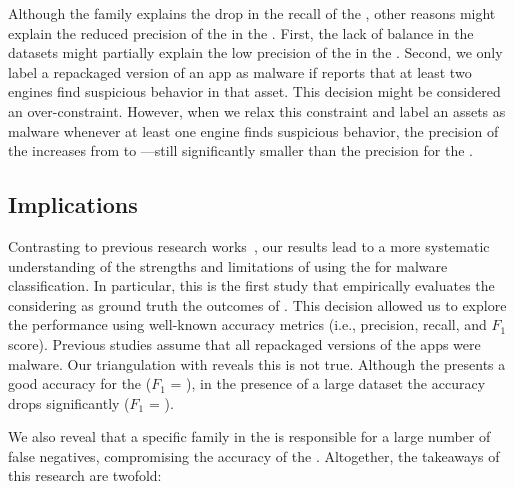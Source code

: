 Although the \gps family explains the drop in the recall of the \mas, other  reasons might explain the reduced precision of the \mas in the \cds. First, the lack of balance in the datasets might partially explain the low precision of the \mas in the \cds. Second, we only label a repackaged version of an app as malware if \vt reports that at least two engines find suspicious behavior in that asset. This decision might be considered an over-constraint. However, when we relax this constraint and label an assets as malware whenever at least one engine finds suspicious behavior, the precision of the \mas increases from  to ---still significantly smaller than the \mas precision for the \sds.

\begin{comment} First, the proportion of malware samples in the
datasets differs. That is, \vt labels \review{$66.95$\%} of the repackaged version of the apps in the \cds as malware---contrasting with 67.64\% of the samples that \vt labels as malware in the \sds.
\end{comment}

\subsection{Implications}\label{sec:implications} 

Contrasting to previous research works~\cite{DBLP:conf/wcre/BaoLL18,DBLP:conf/iceccs/LeB0GL18,DBLP:journals/jss/CostaMMSSBNR22},
our results 
lead to a more systematic understanding
of the strengths and limitations of using the \mas
for malware classification. In particular, this is the
first study that empirically evaluates the \mas
considering as ground truth the outcomes
of \vt. This decision allowed us to explore the
\mas performance using well-known accuracy metrics (i.e., precision, recall, and
$F_1$ score). Previous studies assume that all repackaged versions of the
apps were malware. Our triangulation with \vt reveals this is not true. Although
the \mas presents a good accuracy for the \sds ($F_1$ = \fscoreSmall), 
in the presence of a large dataset the \mas accuracy drops significantly ($F_1$ = \fscore). 

We also reveal that a specific family in the \cds is responsible for a large number of false negatives,
compromising the accuracy of the \mas.
Altogether, the takeaways of this research are twofold:

